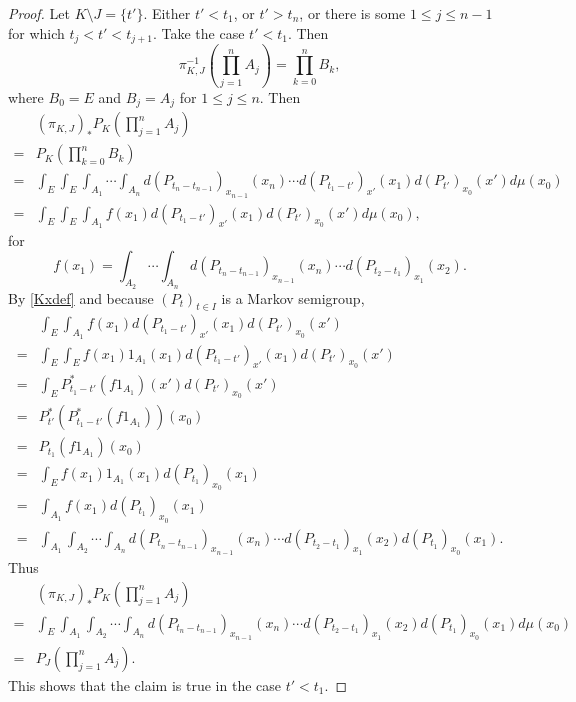 \documentclass{article}
\theoremstyle{definition}
\theoremstyle{definition}
\begin{document}
\begin{proof}
Let $K \setminus J = \{t'\}$. Either $t'<t_1$, or $t'>t_n$, or there is some $1 \leq j \leq n-1$
for which $t_j<t'<t_{j+1}$. Take the case $t'<t_1$. 
Then
\[
\pi_{K,J}^{-1}\left(\prod_{j=1}^n A_j\right) = \prod_{k=0}^n B_k,
\]
where $B_0=E$ and $B_j=A_j$ for $1 \leq j \leq n$. Then
\[
\begin{split}
&(\pi_{K,J})_* P_K\left(\prod_{j=1}^n A_j\right)\\
=&P_K\left(\prod_{k=0}^n B_k\right)\\
=&\int_E \int_E \int_{A_1} \cdots \int_{A_n} d(P_{t_n-t_{n-1}})_{x_{n-1}}(x_n)
\cdots d(P_{t_1-t'})_{x'}(x_1)
d(P_{t'})_{x_0}(x')
d\mu(x_0)\\
=&\int_E \int_E \int_{A_1} f(x_1) d(P_{t_1-t'})_{x'}(x_1) d(P_{t'})_{x_0}(x') d\mu(x_0),
\end{split}
\]
for
\[
f(x_1) = \int_{A_2} \cdots \int_{A_n} d(P_{t_n-t_{n-1}})_{x_{n-1}}(x_n)
\cdots d(P_{t_2-t_1})_{x_1}(x_2).
\]
By \eqref{Kxdef} and because $(P_t)_{t \in I}$ is a Markov semigroup,
\[
\begin{split}
&\int_E \int_{A_1} f(x_1) d(P_{t_1-t'})_{x'}(x_1) d(P_{t'})_{x_0}(x')\\
=&\int_E \int_E f(x_1) 1_{A_1}(x_1) d(P_{t_1-t'})_{x'}(x_1) d(P_{t'})_{x_0}(x')\\
=&\int_E P_{t_1-t'}^* (f 1_{A_1})(x') d(P_{t'})_{x_0}(x')\\
=&P_{t'}^*(P_{t_1-t'}^* (f 1_{A_1}))(x_0)\\
=&P_{t_1}(f 1_{A_1})(x_0)\\
=&\int_E f(x_1) 1_{A_1}(x_1) d(P_{t_1})_{x_0}(x_1)\\
=&\int_{A_1} f(x_1)  d(P_{t_1})_{x_0}(x_1)\\
=&\int_{A_1}  \int_{A_2} \cdots \int_{A_n} d(P_{t_n-t_{n-1}})_{x_{n-1}}(x_n)
\cdots d(P_{t_2-t_1})_{x_1}(x_2)d(P_{t_1})_{x_0}(x_1).
\end{split}
\]
Thus
\[
\begin{split}
&(\pi_{K,J})_* P_K\left(\prod_{j=1}^n A_j\right)\\
=&\int_E \int_{A_1}  \int_{A_2} \cdots \int_{A_n} d(P_{t_n-t_{n-1}})_{x_{n-1}}(x_n)
\cdots d(P_{t_2-t_1})_{x_1}(x_2)d(P_{t_1})_{x_0}(x_1) d\mu(x_0)\\
=&P_J\left(\prod_{j=1}^n A_j\right).
\end{split}
\]
This shows that the claim is true in the case $t'<t_1$.
\end{proof}
\end{document}

